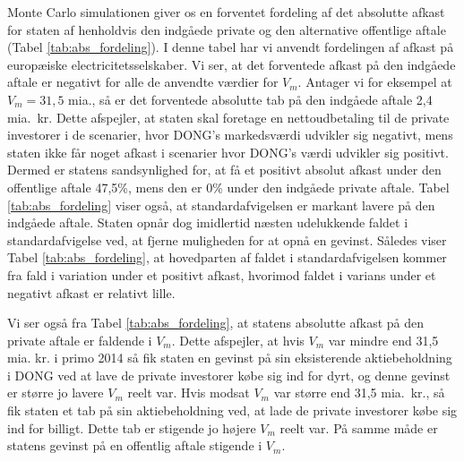 \documentclass{article}
\begin{document}
Monte Carlo simulationen giver os en forventet fordeling af det absolutte afkast for staten af henholdvis den indgåede private og den alternative offentlige aftale (Tabel \ref{tab:abs_fordeling}). I denne tabel har vi anvendt fordelingen af afkast på europæiske electricitetsselskaber. Vi ser, at det forventede afkast på den indgåede aftale er negativt for alle de anvendte værdier for $V_m$. Antager vi for eksempel at $V_m=31{,}5$ mia., så er det forventede absolutte tab på den indgåede aftale 2,4 mia.\ kr. Dette afspejler, at staten skal foretage en nettoudbetaling til de private investorer i de scenarier, hvor DONG's markedsværdi udvikler sig negativt, mens staten ikke får noget afkast i scenarier hvor DONG's værdi udvikler sig positivt. Dermed er statens sandsynlighed for, at få et positivt absolut afkast under den offentlige aftale 47,5\%, mens den er 0\% under den indgåede private aftale. Tabel \ref{tab:abs_fordeling} viser også, at standardafvigelsen er markant lavere på den indgåede aftale. Staten opnår dog imidlertid næsten udelukkende faldet i standardafvigelse ved, at fjerne muligheden for at opnå en gevinst. Således viser Tabel \ref{tab:abs_fordeling}, at hovedparten af faldet i standardafvigelsen kommer fra fald i variation under et positivt afkast, hvorimod faldet i varians under et negativt afkast er relativt lille.

Vi ser også fra Tabel \ref{tab:abs_fordeling}, at statens absolutte afkast på den private aftale er faldende i $V_m$. Dette afspejler, at hvis $V_m$ var mindre end 31,5 mia. kr. i primo 2014 så fik staten en gevinst på sin eksisterende aktiebeholdning i DONG ved at lave de private investorer købe sig ind for dyrt, og denne gevinst er større jo lavere $V_m$ reelt var. Hvis modsat $V_m$ var større end 31,5 mia.\ kr., så fik staten et tab på sin aktiebeholdning ved, at lade de private investorer købe sig ind for billigt. Dette tab er stigende jo højere $V_m$ reelt var. På samme måde er statens gevinst på en offentlig aftale stigende i $V_m$.
\end{document}
